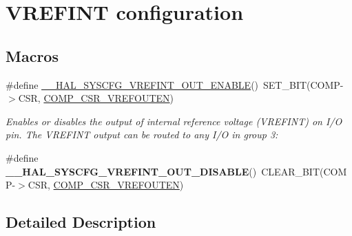 \hypertarget{group___s_y_s_c_f_g___vref_int}{\section{V\-R\-E\-F\-I\-N\-T configuration}
\label{group___s_y_s_c_f_g___vref_int}
}
\subsection*{Macros}
\begin{DoxyCompactItemize}
\item 
\#define \hyperlink{group___s_y_s_c_f_g___vref_int_gaaf7a83b4563a6dc56f6ffcf4b5a4d3ab}{\-\_\-\-\_\-\-H\-A\-L\-\_\-\-S\-Y\-S\-C\-F\-G\-\_\-\-V\-R\-E\-F\-I\-N\-T\-\_\-\-O\-U\-T\-\_\-\-E\-N\-A\-B\-L\-E}()~S\-E\-T\-\_\-\-B\-I\-T(C\-O\-M\-P-\/$>$C\-S\-R, \hyperlink{group___peripheral___registers___bits___definition_gaf1acb48a929c69332b5067efa080aa7e}{C\-O\-M\-P\-\_\-\-C\-S\-R\-\_\-\-V\-R\-E\-F\-O\-U\-T\-E\-N})
\begin{DoxyCompactList}\small\item\em Enables or disables the output of internal reference voltage (V\-R\-E\-F\-I\-N\-T) on I/\-O pin. The V\-R\-E\-F\-I\-N\-T output can be routed to any I/\-O in group 3\-: \end{DoxyCompactList}\item 
\hypertarget{group___s_y_s_c_f_g___vref_int_gacd1d40334627b9dced9471b91cd11f10}{\#define {\bfseries \-\_\-\-\_\-\-H\-A\-L\-\_\-\-S\-Y\-S\-C\-F\-G\-\_\-\-V\-R\-E\-F\-I\-N\-T\-\_\-\-O\-U\-T\-\_\-\-D\-I\-S\-A\-B\-L\-E}()~C\-L\-E\-A\-R\-\_\-\-B\-I\-T(C\-O\-M\-P-\/$>$C\-S\-R, \hyperlink{group___peripheral___registers___bits___definition_gaf1acb48a929c69332b5067efa080aa7e}{C\-O\-M\-P\-\_\-\-C\-S\-R\-\_\-\-V\-R\-E\-F\-O\-U\-T\-E\-N})}\label{group___s_y_s_c_f_g___vref_int_gacd1d40334627b9dced9471b91cd11f10}

\end{DoxyCompactItemize}


\subsection{Detailed Description}


